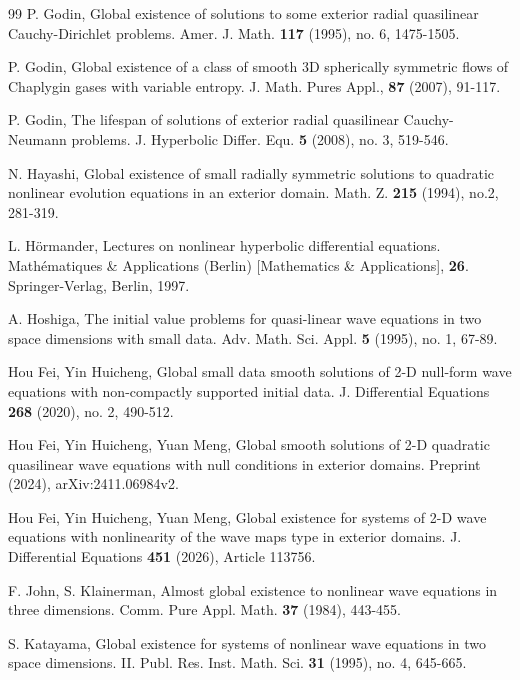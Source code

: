 \documentclass[11pt,twoside]{article}
\theoremstyle{plain}
\theoremstyle{definition}
\numberwithin{equation}{section}
\begin{document}
\begin{thebibliography}{99}
P. Godin, Global existence of solutions to some exterior radial quasilinear Cauchy-Dirichlet problems.
Amer. J. Math. \textbf{117} (1995), no. 6, 1475-1505.

 P. Godin, Global existence of a class of smooth 3D spherically symmetric flows of Chaplygin gases with variable
entropy. J. Math. Pures Appl., \textbf{87} (2007), 91-117.

P. Godin, The lifespan of solutions of exterior radial quasilinear Cauchy-Neumann problems.
J. Hyperbolic Differ. Equ. \textbf{5} (2008), no. 3, 519-546.

N. Hayashi, Global existence of small radially symmetric solutions to quadratic nonlinear evolution equations in an exterior domain.
Math. Z. \textbf{215} (1994), no.2, 281-319.

L. H\"{o}rmander, Lectures on nonlinear hyperbolic differential equations. Math\'ematiques \& Applications (Berlin) [Mathematics \& Applications], \textbf{26}. Springer-Verlag, Berlin, 1997.

A. Hoshiga, The initial value problems for quasi-linear wave equations in two space dimensions with small data.
Adv. Math. Sci. Appl. \textbf{5} (1995), no. 1, 67-89.

Hou Fei,  Yin Huicheng, Global small data smooth solutions of 2-D null-form wave equations with non-compactly supported initial data.
J. Differential Equations \textbf{268} (2020), no. 2, 490-512.


Hou Fei,  Yin Huicheng, Yuan Meng, Global smooth solutions of 2-D quadratic quasilinear wave equations with null conditions in exterior domains.
Preprint (2024), arXiv:2411.06984v2.

Hou Fei, Yin Huicheng, Yuan Meng, Global existence for systems of 2-D wave equations with nonlinearity of the wave maps type in exterior domains.
J. Differential Equations \textbf{451} (2026), Article 113756.


F. John, S. Klainerman, Almost global existence to nonlinear wave equations in three dimensions.
Comm. Pure Appl. Math. \textbf{37} (1984), 443-455.

S. Katayama, Global existence for systems of nonlinear wave equations in two space dimensions. II.
Publ. Res. Inst. Math. Sci. \textbf{31} (1995), no. 4, 645-665.


\end{thebibliography}
\end{document}
